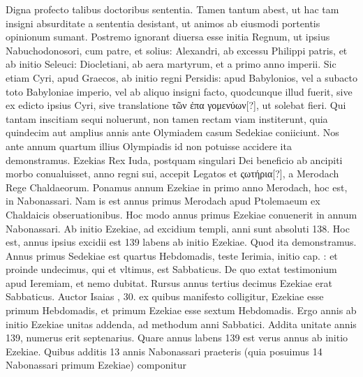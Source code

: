 Digna profecto
talibus doctoribus sententia.
Tamen tantum abest, ut hac tam insigni
absurditate a sententia desistant, ut animos ab eiusmodi portentis
opinionum sumant.
Postremo ignorant diuersa esse initia Regnum,
ut ipsius Nabuchodonosori, cum patre, et solius: Alexandri,
ab excessu Philippi patris, et ab initio Seleuci: Diocletiani, ab aera
martyrum, et a primo anno imperii.
Sic etiam Cyri, apud Graecos, ab
initio regni Persidis: apud Babylonios, vel a subacto toto Babyloniae
imperio, vel ab aliquo insigni facto, quodcunque illud fuerit, sive
ex edicto ipsius Cyri, sive translatione \textgreek{τῶν ἐπα γομενύων[?]},
ut solebat fieri.
Qui tantam inscitiam sequi noluerunt, non tamen rectam viam
institerunt, quia quindecim aut amplius annis ante  Olymiadem
casum Sedekiae coniiciunt.
Nos ante annum quartum illius
Olympiadis id non potuisse accidere ita demonstramus. 
Ezekias
Rex Iuda, postquam singulari Dei beneficio ab ancipiti morbo conualuisset,
anno  regni sui, accepit Legatos et \textgreek{ςωτήρια[?]}, a
Merodach Rege Chaldaeorum.
Ponamus  annum Ezekiae in
primo anno Merodach, hoc est, in  Nabonassari.
Nam is est
annus primus Merodach apud Ptolemaeum ex Chaldaicis obseruationibus. 
Hoc modo annus primus Ezekiae conuenerit in annum
 Nabonassari.
Ab initio Ezekiae, ad excidium templi, anni
sunt absoluti 138.
Hoc est, annus ipsius excidii est 139 labens ab initio
Ezekiae.
Quod ita demonstramus. 
Annus primus Sedekiae est
quartus Hebdomadis, teste Ierimia, initio cap. : et proinde
undecimus, qui et vltimus, est Sabbaticus. 
De quo extat testimonium
apud Ieremiam, et nemo dubitat.
Rursus annus tertius decimus
Ezekiae erat Sabbaticus. 
Auctor Isaias , 30.
 ex quibus
manifesto colligitur,  Ezekiae esse primum Hebdomadis, et primum
Ezekiae esse sextum Hebdomadis. 
Ergo annis ab initio Ezekiae unitas addenda, ad methodum anni Sabbatici.
Addita unitate annis
139, numerus erit septenarius. 
Quare annus labens 139 est verus
annus ab initio Ezekiae.
Quibus additis 13 annis Nabonassari praeteris
(quia posuimus 14 Nabonassari primum Ezekiae) componitur
